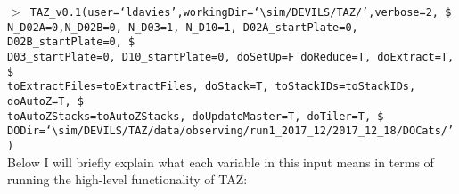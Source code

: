 \documentclass[12pt]{article}
\begin{document}
\hspace{10mm} \texttt{$>$ TAZ\_v0.1(user=`ldavies',workingDir=`$\sim$/DEVILS/TAZ/',verbose=2, \$ \\
N\_D02A=0,N\_D02B=0, N\_D03=1, N\_D10=1, D02A\_startPlate=0, D02B\_startPlate=0, \$ \\ 
D03\_startPlate=0, D10\_startPlate=0, doSetUp=F doReduce=T, doExtract=T,  \$ \\
toExtractFiles=toExtractFiles, doStack=T, toStackIDs=toStackIDs, doAutoZ=T, \$ \\
toAutoZStacks=toAutoZStacks, doUpdateMaster=T, doTiler=T, \$ \\
DODir=`$\sim$/DEVILS/TAZ/data/observing/run1\_2017\_12/2017\_12\_18/DOCats/')} \\

Below I will briefly explain what each variable in this input means in terms of running the high-level functionality of TAZ:\\
\end{document}
